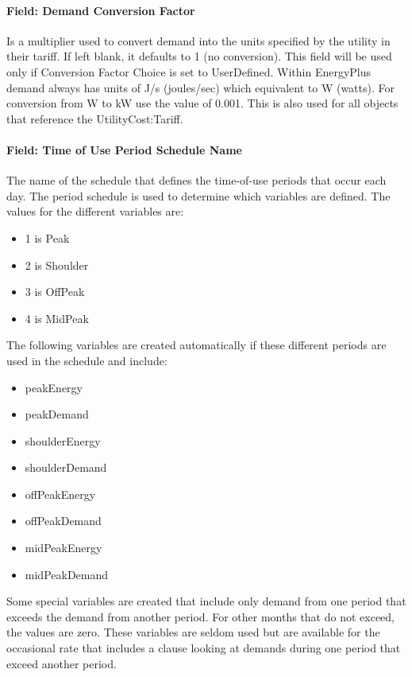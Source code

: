 \paragraph{Field: Demand Conversion Factor}\label{field-demand-conversion-factor}

Is a multiplier used to convert demand into the units specified by the utility in their tariff. If left blank, it defaults to 1 (no conversion). This field will be used only if Conversion Factor Choice is set to UserDefined. Within EnergyPlus demand always has units of J/s (joules/sec) which equivalent to W (watts). For conversion from W to kW use the value of 0.001. This is also used for all objects that reference the UtilityCost:Tariff.

\paragraph{Field: Time of Use Period Schedule Name}\label{field-time-of-use-period-schedule-name}

The name of the schedule that defines the time-of-use periods that occur each day. The period schedule is used to determine which variables are defined. The values for the different variables are:

\begin{itemize}
\item
  1 is Peak
\item
  2 is Shoulder
\item
  3 is OffPeak
\item
  4 is MidPeak
\end{itemize}

The following variables are created automatically if these different periods are used in the schedule and include:

\begin{itemize}
\item
  peakEnergy
\item
  peakDemand
\item
  shoulderEnergy
\item
  shoulderDemand
\item
  offPeakEnergy
\item
  offPeakDemand
\item
  midPeakEnergy
\item
  midPeakDemand
\end{itemize}

Some special variables are created that include only demand from one period that exceeds the demand from another period. For other months that do not exceed, the values are zero. These variables are seldom used but are available for the occasional rate that includes a clause looking at demands during one period that exceed another period.


